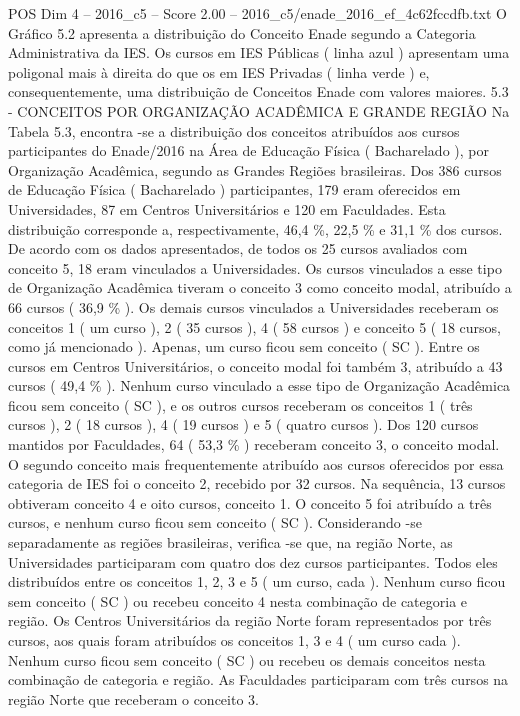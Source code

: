 \begin{textsample}{POS Dim 4 – 2016\_c5 – Score 2.00 – 2016\_c5/enade\_2016\_ef\_4c62fccdfb.txt}
O Gráfico 5.2 apresenta a distribuição do Conceito Enade segundo a Categoria Administrativa da IES.
Os cursos em IES Públicas ( linha azul ) apresentam uma poligonal mais à direita do que os em IES Privadas ( linha verde ) e, consequentemente, uma distribuição de Conceitos Enade com valores maiores. 5.3 - CONCEITOS POR ORGANIZAÇÃO ACADÊMICA E GRANDE REGIÃO Na Tabela 5.3, encontra -se a distribuição dos conceitos atribuídos aos cursos participantes do Enade/2016 na Área de Educação Física ( Bacharelado ), por Organização Acadêmica, segundo as Grandes Regiões brasileiras.
Dos 386 cursos de Educação Física ( Bacharelado ) participantes, 179 eram oferecidos em Universidades, 87 em Centros Universitários e 120 em Faculdades.
Esta distribuição corresponde a, respectivamente, 46,4 \%, 22,5 \% e 31,1 \% dos cursos.
De acordo com os dados apresentados, de todos os 25 cursos avaliados com conceito 5, 18 eram vinculados a Universidades.
Os cursos vinculados a esse tipo de Organização Acadêmica tiveram o conceito 3 como conceito modal, atribuído a 66 cursos ( 36,9 \% ).
Os demais cursos vinculados a Universidades receberam os conceitos 1 ( um curso ), 2 ( 35 cursos ), 4 ( 58 cursos ) e conceito 5 ( 18 cursos, como já mencionado ).
Apenas, um curso ficou sem conceito ( SC ).
Entre os cursos em Centros Universitários, o conceito modal foi também 3, atribuído a 43 cursos ( 49,4 \% ).
Nenhum curso vinculado a esse tipo de Organização Acadêmica ficou sem conceito ( SC ), e os outros cursos receberam os conceitos 1 ( três cursos ), 2 ( 18 cursos ), 4 ( 19 cursos ) e 5 ( quatro cursos ).
Dos 120 cursos mantidos por Faculdades, 64 ( 53,3 \% ) receberam conceito 3, o conceito modal.
O segundo conceito mais frequentemente atribuído aos cursos oferecidos por essa categoria de IES foi o conceito 2, recebido por 32 cursos.
Na sequência, 13 cursos obtiveram conceito 4 e oito cursos, conceito 1.
O conceito 5 foi atribuído a três cursos, e nenhum curso ficou sem conceito ( SC ).
Considerando -se separadamente as regiões brasileiras, verifica -se que, na região Norte, as Universidades participaram com quatro dos dez cursos participantes.
Todos eles distribuídos entre os conceitos 1, 2, 3 e 5 ( um curso, cada ).
Nenhum curso ficou sem conceito ( SC ) ou recebeu conceito 4 nesta combinação de categoria e região.
Os Centros Universitários da região Norte foram representados por três cursos, aos quais foram atribuídos os conceitos 1, 3 e 4 ( um curso cada ).
Nenhum curso ficou sem conceito ( SC ) ou recebeu os demais conceitos nesta combinação de categoria e região.
As Faculdades participaram com três cursos na região Norte que receberam o conceito 3.

\end{textsample}
